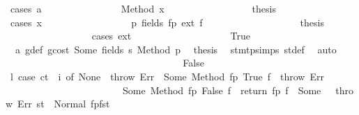 \begin{isabellebody}
\ {\isacharparenleft}{\kern0pt}cases\ a{\isacharparenright}{\kern0pt}\isanewline
\ \ \ \ \ \ \ \ \ \ \ \ \ \ \isamarkupfalse%
\ {\isacharparenleft}{\kern0pt}Method\ x{}{\isacharparenright}{\kern0pt}\isanewline
\ \ \ \ \ \ \ \ \ \ \ \ \ \ \isamarkupfalse%
\ \isamarkupfalse%
\ {\isacharquery}{\kern0pt}thesis\isanewline
\ \ \ \ \ \ \ \ \ \ \ \ \ \ \isamarkupfalse%
\ {\isacharparenleft}{\kern0pt}cases\ x{}{\isacharparenright}{\kern0pt}\isanewline
\ \ \ \ \ \ \ \ \ \ \ \ \ \ \ \ \isamarkupfalse%
\ p{}{\isacharcolon}{\kern0pt}\ {\isacharparenleft}{\kern0pt}fields\ fp\ ext\ f{\isacharparenright}{\kern0pt}\isanewline
\ \ \ \ \ \ \ \ \ \ \ \ \ \ \ \ \isamarkupfalse%
\ \isamarkupfalse%
\ {\isacharquery}{\kern0pt}thesis\isanewline
\ \ \ \ \ \ \ \ \ \ \ \ \ \ \ \ \isamarkupfalse%
\ {\isacharparenleft}{\kern0pt}cases\ ext{\isacharparenright}{\kern0pt}\isanewline
\ \ \ \ \ \ \ \ \ \ \ \ \ \ \ \ \ \ \isamarkupfalse%
\ True\isanewline
\ \ \ \ \ \ \ \ \ \ \ \ \ \ \ \ \ \ \isamarkupfalse%
\ {}{\isacharparenleft}{\kern0pt}{}{\isacharparenright}{\kern0pt}\ a{}\ g{\isacharunderscore}{\kern0pt}def\ gcost\ Some\ fields\ s{}\ Method\ p{}\ \isamarkupfalse%
\ {\isacharquery}{\kern0pt}thesis\ \isamarkupfalse%
\ stmt{\isachardot}{\kern0pt}psimps{\isacharparenleft}{\kern0pt}{}{\isacharparenright}{\kern0pt}\ st{\isacharprime}{\kern0pt}{\isacharunderscore}{\kern0pt}def\ \isamarkupfalse%
\ auto\isanewline
\ \ \ \ \ \ \ \ \ \ \ \ \ \ \ \ \isamarkupfalse%
\isanewline
\ \ \ \ \ \ \ \ \ \ \ \ \ \ \ \ \ \ \isamarkupfalse%
\ False\isanewline
\ \ \ \ \ \ \ \ \ \ \ \ \ \ \ \ \ \ \isamarkupfalse%
\ \isamarkupfalse%
\ l{}{\isacharcolon}{\kern0pt}\ {\isachardoublequoteopen}{\isacharparenleft}{\kern0pt}case\ ct\ {\isachardollar}{\kern0pt}{\isachardollar}{\kern0pt}\ i\ of\ None\ {\isasymRightarrow}\ throw\ Err\ {\isacharbar}{\kern0pt}\ Some\ {\isacharparenleft}{\kern0pt}Method\ {\isacharparenleft}{\kern0pt}fp{\isacharcomma}{\kern0pt}\ True{\isacharcomma}{\kern0pt}\ f{\isacharparenright}{\kern0pt}{\isacharparenright}{\kern0pt}\ {\isasymRightarrow}\ throw\ Err\isanewline
\ \ \ \ \ \ \ \ \ \ \ \ \ \ \ \ \ \ \ \ \ \ \ {\isacharbar}{\kern0pt}\ Some\ {\isacharparenleft}{\kern0pt}Method\ {\isacharparenleft}{\kern0pt}fp{\isacharcomma}{\kern0pt}\ False{\isacharcomma}{\kern0pt}\ f{\isacharparenright}{\kern0pt}{\isacharparenright}{\kern0pt}\ {\isasymRightarrow}\ return\ {\isacharparenleft}{\kern0pt}fp{\isacharcomma}{\kern0pt}\ f{\isacharparenright}{\kern0pt}\ {\isacharbar}{\kern0pt}\ Some\ {\isacharunderscore}{\kern0pt}\ {\isasymRightarrow}\ throw\ Err{\isacharparenright}{\kern0pt}\ st{\isacharprime}{\kern0pt}\ {\isacharequal}{\kern0pt}\ Normal\ {\isacharparenleft}{\kern0pt}{\isacharparenleft}{\kern0pt}fp{\isacharcomma}{\kern0pt}f{\isacharparenright}{\kern0pt}{\isacharcomma}{\kern0pt}st{\isacharprime}{\kern0pt}{\isacharparenright}{\kern0pt}{\isachardoublequoteclose}\ \isamarkupfalse%

\end{isabellebody}
